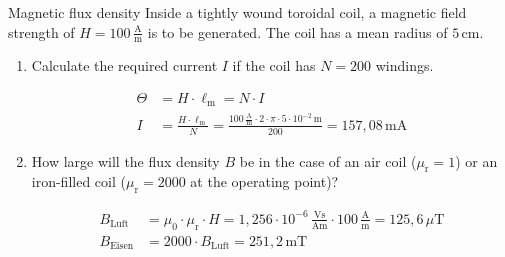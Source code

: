 \begin{frame} 
	\begin{expl}{Magnetic flux density}{}
        Inside a tightly wound toroidal coil, a magnetic field strength of $H=100\,\frac{\mathrm{A}}{\mathrm{m}}$ is to be generated. The coil has a mean radius of $5\,\mathrm{cm}$.
		\begin{enumerate}
			\item Calculate the required current $I$ if the coil has $N=200$ windings.\pause

			      \begin{align*}
				      \varTheta & = H \cdot \ell_{\mathrm{m}} = N\cdot I                                                                                                                  \\
				      I         & =\frac{H\cdot\ell_{\mathrm{m}}}{N}=\frac{100\,\frac{\mathrm{A}}{\mathrm{m}}\cdot 2\cdot \pi\cdot 5\cdot 10^{-2}\,\mathrm{m}}{200} = 157,08\,\mathrm{mA}
			      \end{align*}\pause
			\item How large will the flux density $B$ be in the case of an air coil ($\mu_{\mathrm{r}}=1$) or an iron-filled coil ($\mu_{\mathrm{r}}=2000$ at the operating point)?\pause

			      \begin{align*}
				      B_\mathrm{Luft}  & = \mu_0\cdot \mu_{\mathrm{r}}\cdot H = 1,256\cdot10^{-6}\,\tfrac{\mathrm{Vs}}{\mathrm{Am}} \cdot 100\,\tfrac{\mathrm{A}}{\mathrm{m}} = 125,6\,\mu\mathrm{T} \\
				      B_\mathrm{Eisen} & = 2000\cdot B_\mathrm{Luft} = 251,2\,\mathrm{mT}
			      \end{align*}
		\end{enumerate}
	\end{expl}
\end{frame}

